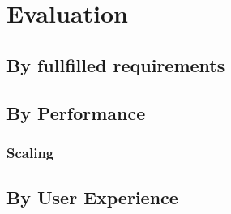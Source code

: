 \chapter{Evaluation}
\section{By fullfilled requirements}
\section{By Performance}
\subsection{Scaling}
\section{By User Experience}
